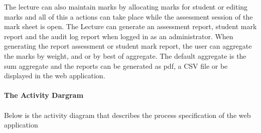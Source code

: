 \documentclass[12pt,a4paper]{article}
\begin{document}
The lecture can also maintain marks by allocating marks for student or editing marks and all of this a actions can take place while the assessment session of the mark sheet is open. The Lecture can generate an assessment report, student mark report and the audit log report when logged in as an administrator. When generating the report assessment or student mark report, the user can aggregate the marks by weight, and or by best of aggregate. The default aggregate is the sum aggregate and the reports can be generated as pdf, a CSV file or be displayed in the web application.\\\\
\textbf{The Activity Dargram}\\\\
Below is the activity diagram that describes the process specification of the web application
\end{document}

